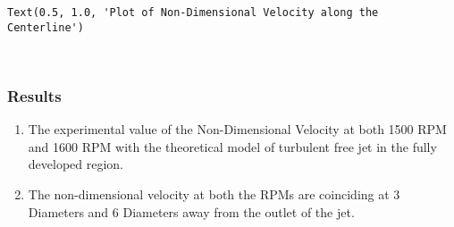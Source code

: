 \documentclass[11pt]{article}
\makeatletter
\providecommand{\tightlist}{%
      \setlength{\itemsep}{0pt}\setlength{\parskip}{0pt}}
\newcommand{\boxspacing}{\kern\kvtcb@left@rule\kern\kvtcb@boxsep}
\newcommand{\prompt}[4]{
        {\ttfamily\llap{{\color{#2}[#3]:\hspace{3pt}#4}}\vspace{-\baselineskip}}
    }
\makeatother
\begin{document}
            \begin{tcolorbox}[breakable, size=fbox, boxrule=.5pt, pad at break*=1mm, opacityfill=0]
\prompt{Out}{outcolor}{76}{\boxspacing}
\begin{Verbatim}[commandchars=\\\{\}]
Text(0.5, 1.0, 'Plot of Non-Dimensional Velocity along the Centerline')
\end{Verbatim}
\end{tcolorbox}
        
    \begin{center}
    \end{center}
    { \hspace*{\fill} \\}
    
    \hypertarget{results}{%
\subsubsection{Results}\label{results}}

\begin{enumerate}
\def\labelenumi{\arabic{enumi}.}
\tightlist
\item
  The experimental value of the Non-Dimensional Velocity at both 1500
  RPM and 1600 RPM with the theoretical model of turbulent free jet in
  the fully developed region.
\item
  The non-dimensional velocity at both the RPMs are coinciding at 3
  Diameters and 6 Diameters away from the outlet of the jet.
\end{enumerate}


    
    
    
\end{document}
